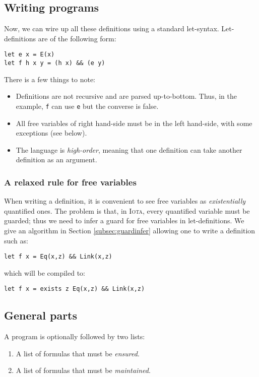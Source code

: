 \documentclass[10pt,a4paper]{article}
\newcommand\Iota{\textsc{Iota}}
\newcommand{\ocaml}{\texttt}
\begin{document}
\subsection{Writing programs}
Now, we can wire up all these definitions using a standard let-syntax. Let-definitions are of the following form:
\begin{verbatim}
let e x = E(x)
let f h x y = (h x) && (e y)
\end{verbatim}
There is a few things to note:
\begin{itemize}
\item Definitions are not recursive and are parsed up-to-bottom. Thus, in the example, \ocaml{f} can use \ocaml{e} but the converse is false.
\item All free variables of right hand-side must be in the left hand-side, with some exceptions (see below).
\item The language is \emph{high-order}, meaning that one definition can take another definition as an argument.
\end{itemize}

\subsubsection{A relaxed rule for free variables}
When writing a definition, it is convenient to see free variables as \emph{existentially} quantified ones. The problem is that, in \Iota{}, every quantified variable must be guarded; thus we need to infer a guard for free variables in let-definitions. We give an algorithm in Section \ref{subsec:guardinfer} allowing one to write a definition such as:
\begin{verbatim}
let f x = Eq(x,z) && Link(x,z)
\end{verbatim}
which will be compiled to:
\begin{verbatim}
let f x = exists z Eq(x,z) && Link(x,z)
\end{verbatim}

\subsection{General parts}
A program is optionally followed by two lists:
\begin{enumerate}
\item A list of formulas that must be \emph{ensured}.
\item A list of formulas that must be \emph{maintained}.
\end{enumerate}
\end{document}
